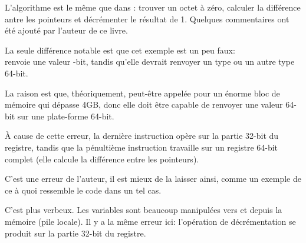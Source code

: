 ﻿




L'algorithme est le même que dans :
trouver un octet à zéro, calculer la différence antre les pointeurs et décrémenter
le résultat de 1.
Quelques commentaires ont été ajouté par l'auteur de ce livre.

La seule différence notable est que cet exemple est un peu faux: \\
 renvoie une valeur -bit, tandis qu'elle devrait renvoyer
un type  ou un autre type 64-bit.

La raison est que, théoriquement,  peut-être appelée pour un énorme
bloc de mémoire qui dépasse 4GB, donc elle doit être capable de renvoyer une valeur
64-bit sur une plate-forme 64-bit.

À cause de cette erreur, la dernière instruction \SUB opère sur la partie 32-bit
du registre, tandis que la pénultième instruction \SUB travaille sur un registre
64-bit complet (elle calcule la différence entre les pointeurs).

C'est une erreur de l'auteur, il est mieux de la laisser ainsi, comme un exemple
de ce à quoi ressemble le code dans un tel cas.




C'est plus verbeux.
Les variables sont beaucoup manipulées vers et depuis la mémoire (pile locale).
Il y a la même erreur ici: l'opération de décrémentation se produit sur la partie
32-bit du registre.
